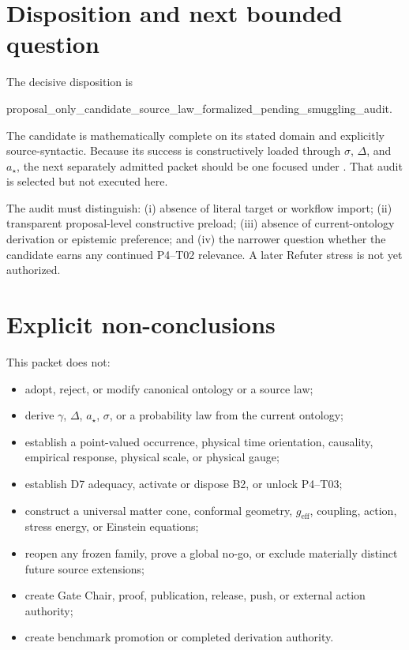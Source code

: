 \documentclass[11pt]{article}
\newcommand{\status}[1]{\textsf{#1}}
\begin{document}
\section{Disposition and next bounded question}

The decisive disposition is
\begin{center}
\status{proposal\_only\_candidate\_source\_law\_formalized\_pending\_smuggling\_audit}.
\end{center}
The candidate is mathematically complete on its stated domain and explicitly
source-syntactic.  Because its success is constructively loaded through
$\sigma$, $\Delta$, and $a_\star$, the next separately admitted packet should
be one focused  under
.  That audit is selected but not executed here.

The audit must distinguish: (i) absence of literal target or workflow import;
(ii) transparent proposal-level constructive preload; (iii) absence of
current-ontology derivation or epistemic preference; and (iv) the narrower
question whether the candidate earns any continued P4--T02 relevance.  A
later Refuter stress is not yet authorized.

\section{Explicit non-conclusions}

This packet does not:
\begin{itemize}
 \item adopt, reject, or modify canonical ontology or a source law;
 \item derive $\gamma$, $\Delta$, $a_\star$, $\sigma$, or a probability law
 from the current ontology;
 \item establish a point-valued occurrence, physical time orientation,
 causality, empirical response, physical scale, or physical gauge;
 \item establish D7 adequacy, activate or dispose B2, or unlock P4--T03;
 \item construct a universal matter cone, conformal geometry,
 $g_{\mathrm{eff}}$, coupling, action, stress energy, or Einstein equations;
 \item reopen any frozen family, prove a global no-go, or exclude materially
 distinct future source extensions;
 \item create Gate Chair, proof, publication, release, push, or external
 action authority;
 \item create benchmark promotion or completed derivation authority.
\end{itemize}
\end{document}
